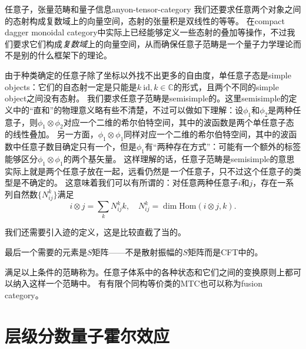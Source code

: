 \begin{back}{任意子，张量范畴和量子信息}{anyon-tensor-category}
    我们还要求任意两个对象之间的态射构成复数域上的向量空间，态射的张量积是双线性的等等。
    在compact dagger monoidal category中实际上已经能够定义一些态射的叠加等操作，不过我们要求它们构成\emph{复数域}上的向量空间，从而确保任意子范畴是一个量子力学理论而不是别的什么框架下的理论。

    由于种类确定的任意子除了坐标以外找不出更多的自由度，单任意子态是simple objects：它们的自态射一定是只能是$k \  \mathrm{id}, k \in \mathbb{C}$的形式，且两个不同的simple object之间没有态射。
    我们要求任意子范畴是semisimple的。这里semisimple的定义中的“直和”的物理意义略有些不清楚，不过可以做如下理解：设$\phi_1$和$\phi_2$是两种任意子，则$\phi_1 \otimes \phi_2$对应一个二维的希尔伯特空间，其中的波函数是两个单任意子态的线性叠加。
    另一方面，$\phi_1 \otimes \phi_1$同样对应一个二维的希尔伯特空间，其中的波函数中任意子数目确定只有一个，但是$\phi_1$有“两种存在方式”：可能有一个额外的标签能够区分$\phi_1 \otimes \phi_1$的两个基矢量。
    这样理解的话，任意子范畴是semisimple的意思实际上就是两个任意子放在一起，远看仍然是\emph{一个}任意子，只不过这个任意子的类型是不确定的。
    这意味着我们可以有所谓的：对任意两种任意子$i$和$j$，存在一系列自然数$\{N_{ij}^k\}$满足
    \begin{equation}
        i \otimes j = \sum_k N_{ij}^k k, \quad N_{ij}^k = \dim \mathrm{Hom}(i \otimes j, k).
    \end{equation}

    我们还需要引入迹的定义，这是比较直截了当的。

    最后一个需要的元素是$S$矩阵——不是散射振幅的$S$矩阵而是CFT中的。 %

    满足以上条件的范畴称为。任意子体系中的各种状态和它们之间的变换原则上都可以纳入这样一个范畴中。
    有有限个同构等价类的MTC也可以称为fusion category。
\end{back}

\section{层级分数量子霍尔效应}